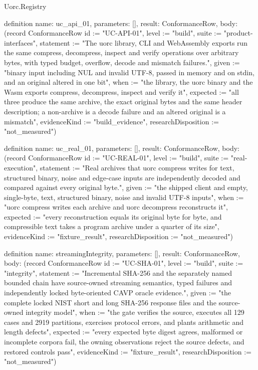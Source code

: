 \begin{lexlean}{Uorc.Registry}
\begin{semanticmodule}
definition{
  name: uc_api_01,
  parameters: [],
  result: ConformanceRow,
  body: (record ConformanceRow {id := "UC-API-01", level := "build", suite := "product-interfaces", statement := "The uorc library, CLI and WebAssembly exports run the same compress, decompress, inspect and verify operations over arbitrary bytes, with typed budget, overflow, decode and mismatch failures.", given := "binary input including NUL and invalid UTF-8, passed in memory and on stdin, and an original altered in one bit", when := "the library, the uorc binary and the Wasm exports compress, decompress, inspect and verify it", expected := "all three produce the same archive, the exact original bytes and the same header description; a non-archive is a decode failure and an altered original is a mismatch", evidenceKind := "build_evidence", researchDisposition := "not_measured"})
}

definition{
  name: uc_real_01,
  parameters: [],
  result: ConformanceRow,
  body: (record ConformanceRow {id := "UC-REAL-01", level := "build", suite := "real-execution", statement := "Real archives that uorc compress writes for text, structured binary, noise and edge-case inputs are independently decoded and compared against every original byte.", given := "the shipped client and empty, single-byte, text, structured binary, noise and invalid UTF-8 inputs", when := "uorc compress writes each archive and uorc decompress reconstructs it", expected := "every reconstruction equals its original byte for byte, and compressible text takes a program archive under a quarter of its size", evidenceKind := "fixture_result", researchDisposition := "not_measured"})
}

definition{
  name: streamingIntegrity,
  parameters: [],
  result: ConformanceRow,
  body: (record ConformanceRow {id := "UC-SHA-01", level := "build", suite := "integrity", statement := "Incremental SHA-256 and the separately named bounded chain have source-owned streaming semantics, typed failures and independently locked byte-oriented CAVP oracle evidence.", given := "the complete locked NIST short and long SHA-256 response files and the source-owned integrity model", when := "the gate verifies the source, executes all 129 cases and 2919 partitions, exercises protocol errors, and plants arithmetic and length defects", expected := "every expected byte digest agrees, malformed or incomplete corpora fail, the owning observations reject the source defects, and restored controls pass", evidenceKind := "fixture_result", researchDisposition := "not_measured"})
}


\end{semanticmodule}
\end{lexlean}
